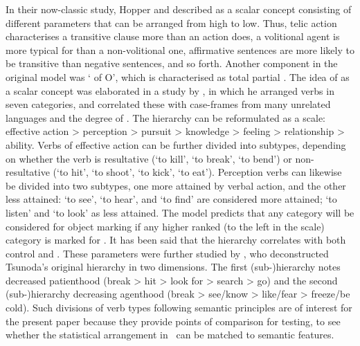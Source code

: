 \documentclass[output=paper]{LSP/langsci}
\begin{document}
In their now-classic study, Hopper and \citet{Hopperetal1980Transitivity} described  as a scalar concept consisting of different parameters that can be arranged from high to low. Thus, telic action characterises a transitive clause more than an  action does, a volitional agent is more typical for  than a non-volitional one, affirmative sentences are more likely to be transitive than negative sentences, and so forth. Another component in the original model was ‘ of O’, which is characterised as total \vs partial . The idea of  as a scalar concept was elaborated in a study by \citet{Tsunoda1985Remarks}, in which he arranged verbs in seven categories, and correlated these with case-frames from many unrelated languages and the degree of . The hierarchy can be reformulated as a scale: effective action > perception > pursuit > knowledge > feeling > relationship > ability. Verbs of effective action can be further divided into subtypes, depending on whether the verb is resultative (‘to kill’, ‘to break’, ‘to bend’) or non-resultative (‘to hit’, ‘to shoot’, ‘to kick’, ‘to eat’). Perception verbs can likewise be divided into two subtypes, one more attained by verbal action, and the other less attained: ‘to see’, ‘to hear’, and ‘to find’ are considered more attained; ‘to listen’ and ‘to look’ as less attained. The model predicts that any category will be considered for object marking if any higher ranked (to the left in the scale) category is marked for . It has been said that the hierarchy correlates with both control and  \citep{Testelec1998Transitivity}. These parameters were further studied by \citet{Malchukov2005Case}, who deconstructed Tsunoda’s original hierarchy in two dimensions. The first (sub\nobreakdash-)hierarchy notes decreased patienthood (break > hit > look for > search > go) and the second (sub\nobreakdash-)hierarchy decreasing agenthood (break > see/know > like/fear > freeze/be cold). Such divisions of verb types following semantic principles are of interest for the present paper because they provide points of comparison for testing, to see whether the statistical arrangement in~ can be matched to semantic features. 
\end{document}
